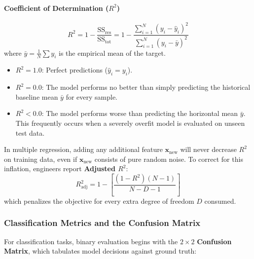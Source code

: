 \paragraph{Coefficient of Determination ($R^2$)}
\begin{equation}
R^2 = 1 - \frac{\text{SS}_{\text{res}}}{\text{SS}_{\text{tot}}} = 1 - \frac{\sum_{i=1}^N (y_i - \hat{y}_i)^2}{\sum_{i=1}^N (y_i - \bar{y})^2}\label{eq:r_squared}
\end{equation}
where $\bar{y} = \frac{1}{N}\sum y_i$ is the empirical mean of the target.
\begin{itemize}
    \item $R^2 = 1.0$: Perfect predictions ($\hat{y}_i = y_i$).
    \item $R^2 = 0.0$: The model performs no better than simply predicting the historical baseline mean $\bar{y}$ for every sample.
    \item $R^2 < 0.0$: The model performs worse than predicting the horizontal mean $\bar{y}$. This frequently occurs when a severely overfit model is evaluated on unseen test data.
\end{itemize}

\begin{warning}
In multiple regression, adding any additional feature $\mathbf{x}_{\text{new}}$ will never decrease $R^2$ on training data, even if $\mathbf{x}_{\text{new}}$ consists of pure random noise. To correct for this inflation, engineers report \textbf{Adjusted $R^2$}:
\begin{equation}
R^2_{\text{adj}} = 1 - \left[ \frac{(1 - R^2)(N - 1)}{N - D - 1} \right]\label{eq:adjusted_r2}
\end{equation}
which penalizes the objective for every extra degree of freedom $D$ consumed.
\end{warning}

\subsubsection{Classification Metrics and the Confusion Matrix}

For classification tasks, binary evaluation begins with the $2 \times 2$ \textbf{Confusion Matrix}, which tabulates model decisions against ground truth:

